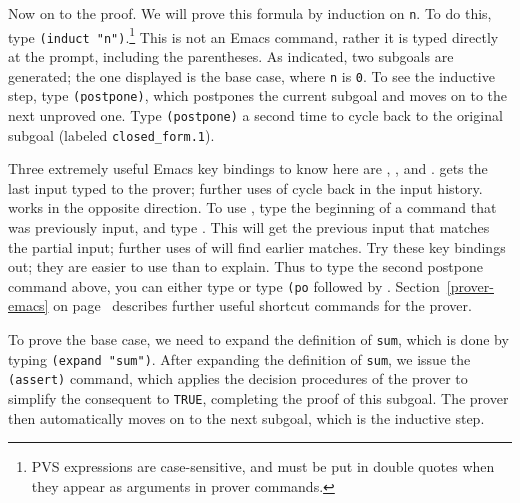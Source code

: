 Now on to the proof.  We will prove this formula by induction on
\texttt{n}.  To do this, type \texttt{(induct "n")}.\footnote{PVS expressions are
case-sensitive, and must be put in double quotes when they appear as
arguments in prover commands.} This is not an Emacs command, rather it
is typed directly at the prompt, including the parentheses.  As indicated,
two subgoals are generated; the one displayed is the base case, where
\texttt{n} is \texttt{0}.  To see the inductive step, type
\texttt{(postpone)},
which postpones the current subgoal and moves on to the next unproved one.
Type \texttt{(postpone)} a second time to cycle back to the original
subgoal (labeled \texttt{closed\_form.1}).

Three extremely useful Emacs key bindings to know here are ,
, and .   gets the last input typed to the
prover; further uses of  cycle back in the input history.
 works in the opposite direction.  To use , type the
beginning of a command that was previously input, and type .
This will get the previous input that matches the partial input; further
uses of  will find earlier matches.  Try these key bindings out;
they are easier to use than to explain.  Thus to type the second postpone
command above, you can either type  or type \texttt{(po} followed
by .  Section~\ref{prover-emacs} on page~\pageref{prover-emacs}
describes further useful shortcut commands for the prover.

To prove the base case, we need to expand the definition of \texttt{sum},
which is done by typing \texttt{(expand "sum")}.  After expanding the definition of
\texttt{sum}, we issue the \texttt{(assert)} command, which applies the decision
procedures of the prover to simplify the consequent to \texttt{TRUE},
completing the proof of this subgoal.  The prover then automatically moves
on to the next subgoal, which is the inductive step.

